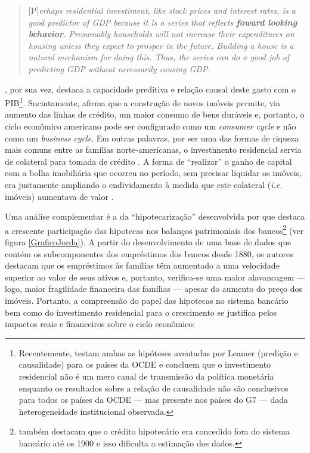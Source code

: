 \begin{quote}
	
	[P]\textit{erhaps residential investiment, like stock prices and interest rates, is a good predictor of GDP because it is a series that reflects \textbf{foward looking behavior}. Presumably households will not increase their expenditures on housing unless they expect to prosper in the future. Building a house is a natural mechanism for doing this. Thus, the series can do a good job of predicting GDP without necessarily causing GDP.}
	\cite[p.~267, grifos adicionados]{green_follow_1997}
\end{quote}
\textcite{leamer_housing_2007}, por sua vez, destaca a capacidade preditiva e relação causal  deste gasto com o PIB\footnote{Recentemente, \textcite{huang_is_2018} testam ambas as hipóteses aventadas por Leamer  (predição e causalidade) para os países da OCDE e concluem que o investimento residencial não é um mero canal de transmissão da política monetária enquanto os resultados sobre a relação de causalidade não são conclusivos para todos os países da OCDE --- mas presente nos países do G7 --- dada heterogeneidade institucional observada.}. Sucintamente, afirma que a construção de novos imóveis permite, via aumento das linhas de crédito, um maior consumo de bens duráveis e, portanto, o ciclo econômico americano pode ser configurado como um \textit{consumer cycle} e não como um \textit{business cycle}. Em outras palavras, por ser  uma das formas de riqueza mais comuns entre as famílias norte-americanas, o investimento residencial servia de colateral para tomada de crédito \cite{teixeira_uma_2011}. A forma de ``realizar'' o ganho de capital com a bolha imobiliária que ocorreu no período, sem precisar liquidar os imóveis, era justamente ampliando o endividamento à medida que este colateral (\textit{i.e.} imóveis) aumentava de valor \cite{teixeira_crescimento_2015}. 

Uma análise complementar é a da  ``hipotecarização'' desenvolvida por \textcite{jorda_great_2014} que destaca a crescente participação das hipotecas nos balanços patrimoniais dos bancos\footnote{\textcite{jorda_great_2014} também destacam que o crédito hipotecário era concedido fora do sistema bancário até os 1900 e isso dificulta a estimação dos dados.} (ver figura \ref{GraficoJorda}). A partir do desenvolvimento de uma base de dados que contém os subcomponentes dos empréstimos dos bancos desde 1880, os autores destacam que os empréstimos às famílias têm aumentado a uma velocidade superior ao valor de seus ativos e, portanto, verifica-se uma maior alavancagem --- logo, maior fragilidade financeira das famílias --- apesar do aumento do preço dos imóveis. Portanto, a compreensão do papel das hipotecas no sistema bancário bem como do investimento residencial para o crescimento se justifica pelos impactos reais e financeiros sobre o ciclo econômico: 


